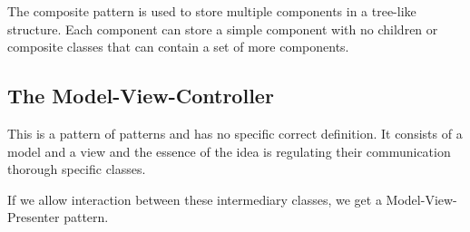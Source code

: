 \documentclass[a4paper, 12pt, twoside]{article}
\begin{document}
The composite pattern is used to store multiple components in a
tree-like structure. Each component can store a simple component
with no children or composite classes that can contain a set of
more components.

\subsection{The Model-View-Controller}

This is a pattern of patterns and has no specific correct definition.
It consists of a model and a view and the essence of the idea is 
regulating their communication thorough specific classes.

\vspace{\baselineskip}

If we allow interaction between these intermediary classes, we get
a Model-View-Presenter pattern. 
\end{document}
